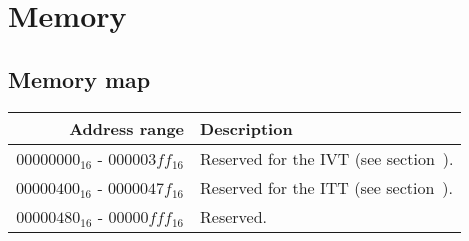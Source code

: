 \section{Memory}

\subsection{Memory map}

\begin{tabular}{ | r | l | }
	\hline
	\textbf{Address range} & \textbf{Description} \\
	\hline
	$00000000_{16}$ - $000003ff_{16}$ & Reserved for the IVT (see section~\elref{sec:interrupts}). \\
	\hline
	$00000400_{16}$ - $0000047f_{16}$ & Reserved for the ITT (see section~\elref{sec:itu}). \\
	\hline
	$00000480_{16}$ - $00000fff_{16}$ & Reserved. \\
	\hline
\end{tabular}
